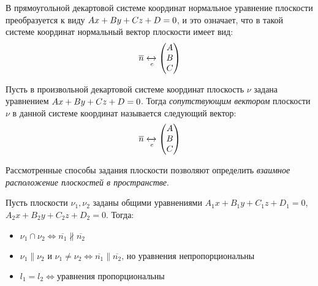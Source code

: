 \begin{note}
	В прямоугольной декартовой системе координат нормальное уравнение плоскости преобразуется к виду $Ax+By+Cz\hm{+}D=0$, и это означает, что в такой системе координат нормальный вектор плоскости имеет вид:
	\[\overline{n} \xleftrightarrow[e]{} \begin{pmatrix}A\\B\\C\end{pmatrix}\]
\end{note}

\begin{definition}
	Пусть в произвольной декартовой системе координат плоскость $\nu$ задана уравнением $Ax+By+Cz\hm{+}D=0$. Тогда \textit{сопутствующим вектором} плоскости $\nu$ в данной системе координат называется следующий вектор:
	\[\overline{n} \xleftrightarrow[e]{} \begin{pmatrix}A\\B\\C\end{pmatrix}\]
\end{definition}

Рассмотренные способы задания плоскости позволяют определить \textit{взаимное расположение плоскостей в пространстве}.

\begin{proposition}
	Пусть плоскости $\nu_1, \nu_2$ заданы общими уравнениями $A_1x+B_1y+C_1z+D_1 = 0$, $A_2x+B_2y+C_2z+D_2 = 0$. Тогда:
	\begin{itemize}
		\item $\nu_1 \cap \nu_2 \Leftrightarrow \overline{n_1} \nparallel \overline{n_2}$
		\item $\nu_1 \parallel \nu_2 \text{ и } \nu_1 \ne \nu_2 \Leftrightarrow \overline{n_1} \parallel \overline{n_2} \text{, но уравнения непропорциональны}$
		\item $l_1 = l_2 \Leftrightarrow  \text{уравнения пропорциональны}$
	\end{itemize}
\end{proposition}

